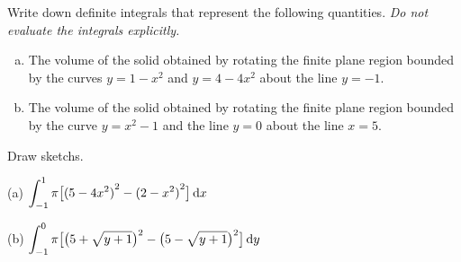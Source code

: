 \begin{Mquestion}[2001A,M121 2001A]  %
Write down definite integrals that represent the following quantities.
\emph{Do not evaluate the integrals explicitly.}
\begin{enumerate}[(a)]
\item
The volume of the solid obtained by rotating the finite plane
region bounded by the curves $y=1-x^2$ and $y=4-4x^2$ about the line $y=-1$.
\item
The volume of the solid obtained by rotating the finite plane
region bounded by the curve $y=x^2-1$ and the line $y=0$ about the line $x=5$.
\end{enumerate}
\end{Mquestion}

\begin{hint}
Draw sketchs.
\end{hint}

\begin{answer} (a)
$\displaystyle\int_{-1}^{1}\pi\big[{(5-4x^2)}^2-{(2-x^2)}^2\big]\,\mathrm{d}x$

\noindent (b)
$\displaystyle\int _{-1}^0   \pi\big[\big(5+\sqrt{y+1}\big)^2-\big(5-\sqrt{y+1}\big)^2\big]\,\mathrm{d}y$

\end{answer}

